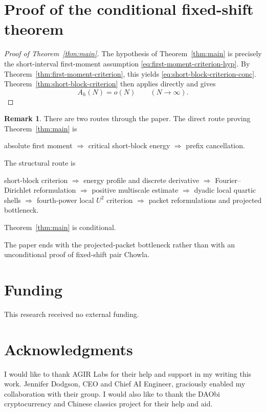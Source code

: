 \documentclass[11pt]{scrartcl}
\numberwithin{equation}{section}
\theoremstyle{definition}
\newtheorem{remark}[theorem]{Remark}
\newcommand{\1}{\mathbf 1}
\begin{document}
\section{Proof of the conditional fixed-shift theorem}

\begin{proof}[Proof of Theorem~\ref{thm:main}]
The hypothesis of Theorem~\ref{thm:main} is precisely the short-interval first-moment assumption \eqref{eq:first-moment-criterion-hyp}. By Theorem~\ref{thm:first-moment-criterion}, this yields \eqref{eq:short-block-criterion-conc}. Theorem~\ref{thm:short-block-criterion} then applies directly and gives
\[
A_h(N)=o(N)
\qquad (N\to\infty).
\]
\end{proof}

\begin{remark}
There are two routes through the paper. The direct route proving Theorem~\ref{thm:main} is
\begin{center}
absolute first moment
$\Longrightarrow$ critical short-block energy
$\Longrightarrow$ prefix cancellation.
\end{center}
The structural route is
\begin{center}
short-block criterion
$\Longrightarrow$ energy profile and discrete derivative
$\Longrightarrow$ Fourier--Dirichlet reformulation
$\Longrightarrow$ positive multiscale estimate
$\Longrightarrow$ dyadic local quartic shells
$\Longrightarrow$ fourth-power local $U^2$ criterion
$\Longrightarrow$ packet reformulations and projected bottleneck.
\end{center}
Theorem~\ref{thm:main} is conditional.\par
The paper ends with the projected-packet bottleneck rather than with an unconditional proof of fixed-shift pair Chowla.
\end{remark}

\section*{Funding}
This research received no external funding.

\section{Acknowledgments}

I would like to thank AGIR Labs for their help and support in my writing this work. Jennifer Dodgson, CEO and Chief AI Engineer, graciously enabled my collaboration with their group. I would also like to thank the DAObi cryptocurrency and Chinese classics project for their help and aid. 
\end{document}
